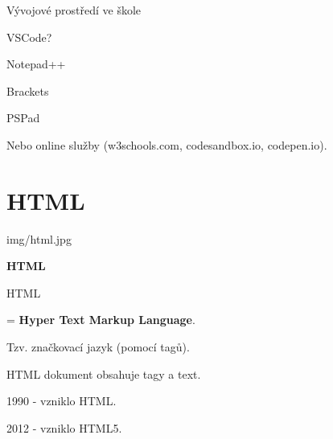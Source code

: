 \documentclass[aspectratio=169]{beamer}
\begin{document}
\begin{frame}{Vývojové prostředí ve škole}
    \begin{cardTiny}
        \begin{flushleft}
            VSCode?

            \vspace{3ex}
            Notepad++

            \vspace{3ex}
            Brackets

            \vspace{3ex}
            PSPad

            \vspace{3ex}
            Nebo online služby (w3schools.com, codesandbox.io, codepen.io).
        \end{flushleft}
    \end{cardTiny}
\end{frame}



\section{HTML}

\begin{frameImg}[width]{img/html.jpg}
    \vspace*{60mm}
    \begin{cardTiny}
        \vspace*{\fill}
        \begin{center}
            \textbf{HTML}
        \end{center}
    \end{cardTiny}
\end{frameImg}

\begin{frame}{HTML}
    \begin{cardTiny}
        = \textbf{Hyper Text Markup Language}.

        Tzv. značkovací jazyk (pomocí tagů).

        HTML dokument obsahuje tagy a text.

        \vspace{2ex}

        1990 - vzniklo HTML.

        2012 - vzniklo HTML5.
    \end{cardTiny}
\end{frame}
\end{document}
